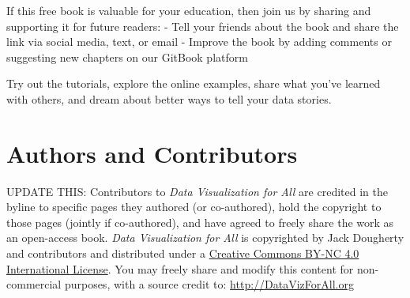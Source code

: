 \documentclass[
  english,
]{book}
\begin{document}
If this free book is valuable for your education, then join us by sharing and supporting it for future readers:
- Tell your friends about the book and share the link via social media, text, or email
- Improve the book by adding comments or suggesting new chapters on our GitBook platform

Try out the tutorials, explore the online examples, share what you've learned with others, and dream about better ways to tell your data stories.

\hypertarget{authors}{%
\section{Authors and Contributors}\label{authors}}

UPDATE THIS: Contributors to \emph{Data Visualization for All} are credited in the byline to specific pages they authored (or co-authored), hold the copyright to those pages (jointly if co-authored), and have agreed to freely share the work as an open-access book. \emph{Data Visualization for All} is copyrighted by Jack Dougherty and contributors and distributed under a \href{http://creativecommons.org/licenses/by-nc/4.0/}{Creative Commons BY-NC 4.0 International License}. You may freely share and modify this content for non-commercial purposes, with a source credit to: \url{http://DataVizForAll.org}
\end{document}
